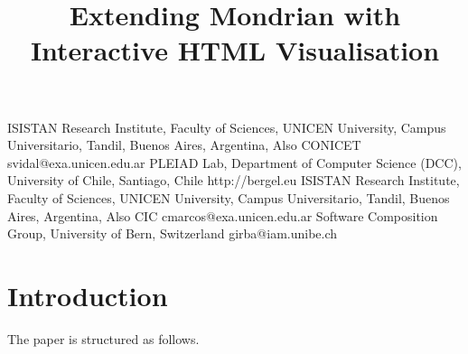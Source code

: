 \documentclass[preprint,10pt]{sigplanconf}
\newcommand{\seclabel}[1]{\label{sec:#1}}
\newcommand{\secref}[1]{Section~\ref{sec:#1}\xspace}
\begin{document}

\title{Extending Mondrian with Interactive HTML Visualisation}

	{ISISTAN Research Institute, Faculty of Sciences, UNICEN University, Campus Universitario, Tandil, Buenos Aires, Argentina, Also CONICET}
	{svidal@exa.unicen.edu.ar}
	{PLEIAD Lab, Department of Computer Science (DCC), University of Chile, Santiago, Chile}
	{http://bergel.eu}
	{ISISTAN Research Institute, Faculty of Sciences, UNICEN University, Campus Universitario, Tandil, Buenos Aires, Argentina, Also CIC}
	{cmarcos@exa.unicen.edu.ar}
	{Software Composition Group, University of Bern, Switzerland}
	{girba@iam.unibe.ch}


\maketitle


\begin{abstract}
\end{abstract}

\section{Introduction}\seclabel{introduction}






The paper is structured as follows.


%
\end{document}
